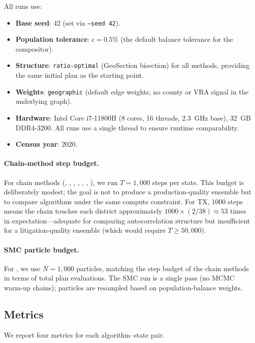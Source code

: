 All runs use:
\begin{itemize}
  \item \textbf{Base seed}: 42 (set via \texttt{--seed 42}).
  \item \textbf{Population tolerance}: $\epsilon = 0.5\%$ (the default
        balance tolerance for the compositor).
  \item \textbf{Structure}: \texttt{ratio-optimal} (GeoSection bisection)
        for all methods, providing the same initial plan as the starting
        point.
  \item \textbf{Weights}: \texttt{geographic} (default edge weights,
        no county or VRA signal in the underlying graph).
  \item \textbf{Hardware}: Intel Core i7-11800H (8 cores, 16 threads,
        2.3~GHz base), 32~GB DDR4-3200. All runs use a single thread to
        ensure runtime comparability.
  \item \textbf{Census year}: 2020.
\end{itemize}

\paragraph{Chain-method step budget.}
For chain methods (\sburst{}, \flip{}, \fr{}, \msp{}, \ms{},
\sburstf{}, \vra{}), we run $T = 1{,}000$ steps per state.
This budget is deliberately modest; the goal is not to produce a
production-quality ensemble but to compare algorithms under the same
compute constraint.
For TX, 1000 steps means the chain touches each district approximately
$1000 \times (2/38) \approx 53$ times in expectation---adequate for
comparing autocorrelation structure but insufficient for a litigation-quality
ensemble (which would require $T \geq 50{,}000$).

\paragraph{SMC particle budget.}
For \smc{}, we use $N = 1{,}000$ particles, matching the step budget of
the chain methods in terms of total plan evaluations.
The SMC run is a single pass (no MCMC warm-up chains); particles are
resampled based on population-balance weights.

\subsection{Metrics}

We report four metrics for each algorithm--state pair.

